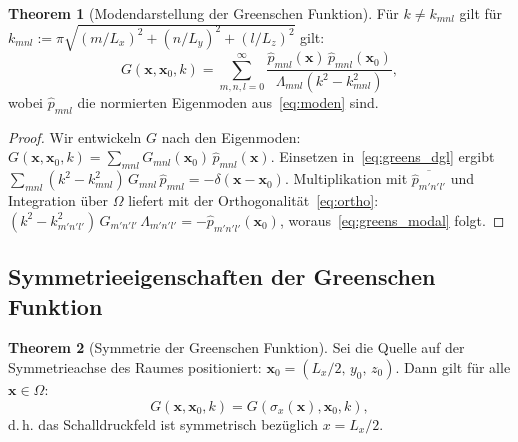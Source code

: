 ﻿\documentclass[12pt, a4paper]{article}
\theoremstyle{definition}
\newtheorem{theorem}{Theorem}[section]
\theoremstyle{remark}
\newcommand{\Lx}{L_x}
\newcommand{\Ly}{L_y}
\newcommand{\Lz}{L_z}
\begin{document}
\begin{theorem}[Modendarstellung der Greenschen Funktion]
\label{thm:greens_modal}
Für $k \neq k_{mnl}$ gilt für $k_{mnl} := \pi\sqrt{(m/\Lx)^2 + (n/\Ly)^2 + (l/\Lz)^2}$ gilt:
\begin{equation}
  G(\mathbf{x},\mathbf{x}_0,k) = \sum_{m,n,l=0}^{\infty}
  \frac{\hat{p}_{mnl}(\mathbf{x})\,\hat{p}_{mnl}(\mathbf{x}_0)}
       {\Lambda_{mnl}(k^2 - k_{mnl}^2)},
  \label{eq:greens_modal}
\end{equation}
wobei $\hat{p}_{mnl}$ die normierten Eigenmoden aus~\eqref{eq:moden} sind.
\end{theorem}

\begin{proof}
Wir entwickeln $G$ nach den Eigenmoden:
$G(\mathbf{x},\mathbf{x}_0,k) = \sum_{mnl} G_{mnl}(\mathbf{x}_0)\,\hat{p}_{mnl}(\mathbf{x}).$
Einsetzen in~\eqref{eq:greens_dgl} ergibt
$\sum_{mnl}(k^2 - k_{mnl}^2)\,G_{mnl}\,\hat{p}_{mnl} = -\delta(\mathbf{x}-\mathbf{x}_0)$.
Multiplikation mit $\overline{\hat{p}_{m'n'l'}}$ und Integration über $\Omega$ liefert
mit der Orthogonalität~\eqref{eq:ortho}:
$(k^2 - k_{m'n'l'}^2)\,G_{m'n'l'}\,\Lambda_{m'n'l'} = -\hat{p}_{m'n'l'}(\mathbf{x}_0)$,
woraus~\eqref{eq:greens_modal} folgt. 
\end{proof}

\subsection{Symmetrieeigenschaften der Greenschen Funktion}

\begin{theorem}[Symmetrie der Greenschen Funktion]
\label{thm:sym_green}
Sei die Quelle auf der Symmetrieachse des Raumes positioniert:
$\mathbf{x}_0 = (\Lx/2,\, y_0,\, z_0)$.
Dann gilt für alle $\mathbf{x} \in \Omega$:
\begin{equation}
  G(\mathbf{x},\mathbf{x}_0,k) = G(\sigma_x(\mathbf{x}),\mathbf{x}_0,k),
  \label{eq:sym_green}
\end{equation}
d.\,h. das Schalldruckfeld ist symmetrisch bezüglich $x = \Lx/2$.
\end{theorem}
\end{document}
